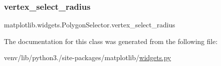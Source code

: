 \subsubsection{\texorpdfstring{vertex\+\_\+select\+\_\+radius}{vertex\_select\_radius}}
{\footnotesize\ttfamily matplotlib.\+widgets.\+Polygon\+Selector.\+vertex\+\_\+select\+\_\+radius}



The documentation for this class was generated from the following file\+:\begin{DoxyCompactItemize}
\item 
venv/lib/python3./site-\/packages/matplotlib/\hyperlink{widgets_8py}{widgets.\+py}\end{DoxyCompactItemize}
